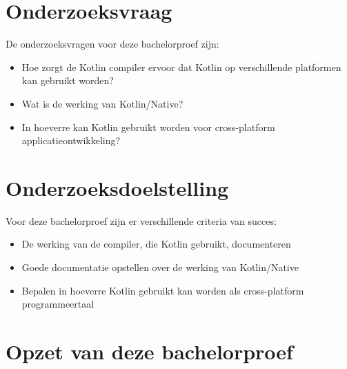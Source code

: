 \section{Onderzoeksvraag}
\label{sec:onderzoeksvraag}
De onderzoeksvragen voor deze bachelorproef zijn: 
\begin{itemize}
	\item Hoe zorgt de Kotlin compiler ervoor dat Kotlin op verschillende platformen kan gebruikt worden?
	\item Wat is de werking van Kotlin/Native?
	\item In hoeverre kan Kotlin gebruikt worden voor cross-platform applicatieontwikkeling?
\end{itemize}

\section{Onderzoeksdoelstelling}
\label{sec:onderzoeksdoelstelling}
Voor deze bachelorproef zijn er verschillende criteria van succes:
\begin{itemize}
	\item De werking van de compiler, die Kotlin gebruikt, documenteren
	\item Goede documentatie opstellen over de werking van Kotlin/Native
	\item Bepalen in hoeverre Kotlin gebruikt kan worden als cross-platform programmeertaal
\end{itemize}

\section{Opzet van deze bachelorproef}
\label{sec:opzet-bachelorproef}

